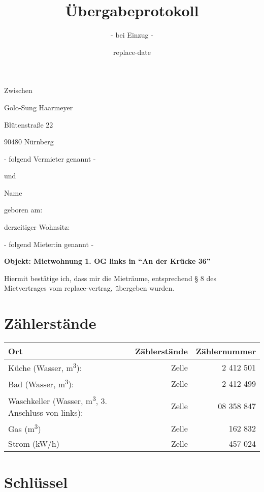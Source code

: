 \documentclass{article}
\title{Übergabeprotokoll}
\subtitle{- bei Einzug -}
\date{replace-date} %
\begin{document}
\maketitle
\thispagestyle{fancy}



Zwischen

Golo-Sung Haarmeyer

Blütenstraße 22

90480 Nürnberg

\hfill - folgend Vermieter genannt -

und

Name

geboren am: 

derzeitiger Wohnsitz: 

\hfill - folgend Mieter:in genannt - 

\vspace{1cm}

\textbf{Objekt: Mietwohnung 1. OG links in \enquote{An der Krücke 36}}

Hiermit bestätige ich, dass mir die Mieträume, entsprechend § 8 des Mietvertrages vom replace-vertrag, übergeben wurden.

\section{Zählerstände}%
  \label{sec:Zählerstände}
  
    \begin{tabular}{|l|r|r|}
      \hline
      Ort & Zählerstände & Zählernummer \\
      \hline
      Küche (Wasser, m\textsuperscript{3}): & Zelle & 2 412 501 \\
      \hline
      Bad (Wasser, m\textsuperscript{3}): & Zelle & 2 412 499 \\
      \hline
      Waschkeller (Wasser, m\textsuperscript{3}, 3. Anschluss von links): & Zelle & 08 358 847 \\
      \hline
      Gas (m\textsuperscript{3}) & Zelle & 162 832 \\
      \hline
      Strom (kW/h) & Zelle & 457 024 \\
      \hline
    \end{tabular}

\section{Schlüssel}%
  \label{sec:Schlüssel}
  
\end{document}
